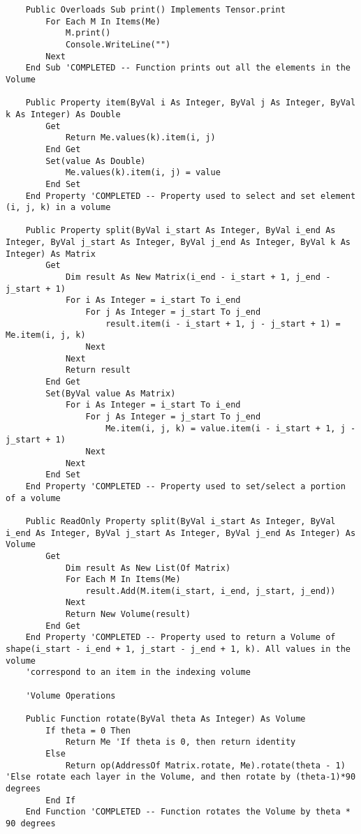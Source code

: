 \begin{verbatim}
    Public Overloads Sub print() Implements Tensor.print
        For Each M In Items(Me)
            M.print()
            Console.WriteLine("")
        Next
    End Sub 'COMPLETED -- Function prints out all the elements in the Volume

    Public Property item(ByVal i As Integer, ByVal j As Integer, ByVal k As Integer) As Double
        Get
            Return Me.values(k).item(i, j)
        End Get
        Set(value As Double)
            Me.values(k).item(i, j) = value
        End Set
    End Property 'COMPLETED -- Property used to select and set element (i, j, k) in a volume

    Public Property split(ByVal i_start As Integer, ByVal i_end As Integer, ByVal j_start As Integer, ByVal j_end As Integer, ByVal k As Integer) As Matrix
        Get
            Dim result As New Matrix(i_end - i_start + 1, j_end - j_start + 1)
            For i As Integer = i_start To i_end
                For j As Integer = j_start To j_end
                    result.item(i - i_start + 1, j - j_start + 1) = Me.item(i, j, k)
                Next
            Next
            Return result
        End Get
        Set(ByVal value As Matrix)
            For i As Integer = i_start To i_end
                For j As Integer = j_start To j_end
                    Me.item(i, j, k) = value.item(i - i_start + 1, j - j_start + 1)
                Next
            Next
        End Set
    End Property 'COMPLETED -- Property used to set/select a portion of a volume

    Public ReadOnly Property split(ByVal i_start As Integer, ByVal i_end As Integer, ByVal j_start As Integer, ByVal j_end As Integer) As Volume
        Get
            Dim result As New List(Of Matrix)
            For Each M In Items(Me)
                result.Add(M.item(i_start, i_end, j_start, j_end))
            Next
            Return New Volume(result)
        End Get
    End Property 'COMPLETED -- Property used to return a Volume of shape(i_start - i_end + 1, j_start - j_end + 1, k). All values in the volume
    'correspond to an item in the indexing volume

    'Volume Operations

    Public Function rotate(ByVal theta As Integer) As Volume
        If theta = 0 Then
            Return Me 'If theta is 0, then return identity
        Else
            Return op(AddressOf Matrix.rotate, Me).rotate(theta - 1) 'Else rotate each layer in the Volume, and then rotate by (theta-1)*90 degrees
        End If
    End Function 'COMPLETED -- Function rotates the Volume by theta * 90 degrees


\end{verbatim}
